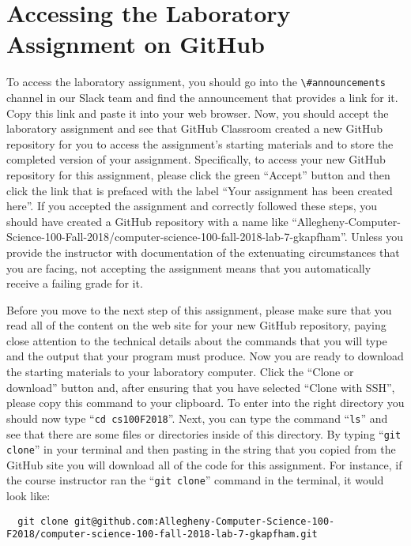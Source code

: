 \documentclass[11pt]{article}
\newcommand{\command}[1]{``\lstinline{#1}''}
\newcommand{\channel}[1]{\lstinline{#1}}
\begin{document}
\section*{Accessing the Laboratory Assignment on GitHub}

To access the laboratory assignment, you should go into the
\channel{\#announcements} channel in our Slack team and find the announcement
that provides a link for it. Copy this link and paste it into your web browser.
Now, you should accept the laboratory assignment and see that GitHub Classroom
created a new GitHub repository for you to access the assignment's starting
materials and to store the completed version of your assignment. Specifically,
to access your new GitHub repository for this assignment, please click the green
``Accept'' button and then click the link that is prefaced with the label ``Your
assignment has been created here''. If you accepted the assignment and correctly
followed these steps, you should have created a GitHub repository with a name
like
``Allegheny-Computer-Science-100-Fall-2018/computer-science-100-fall-2018-lab-7-gkapfham''.
Unless you provide the instructor with documentation of the extenuating
circumstances that you are facing, not accepting the assignment means that you
automatically receive a failing grade for it.

Before you move to the next step of this assignment, please make sure that you
read all of the content on the web site for your new GitHub repository, paying
close attention to the technical details about the commands that you will type
and the output that your program must produce. Now you are ready to download the
starting materials to your laboratory computer. Click the ``Clone or download''
button and, after ensuring that you have selected ``Clone with SSH'', please
copy this command to your clipboard. To enter into the right directory you
should now type \command{cd cs100F2018}. Next, you can type the command
\command{ls} and see that there are some files or directories inside of this
directory. By typing \command{git clone} in your terminal and then pasting in
the string that you copied from the GitHub site you will download all of the
code for this assignment. For instance, if the course instructor ran the
\command{git clone} command in the terminal, it would look like:

\begin{lstlisting}
  git clone git@github.com:Allegheny-Computer-Science-100-F2018/computer-science-100-fall-2018-lab-7-gkapfham.git
\end{lstlisting}
\end{document}
